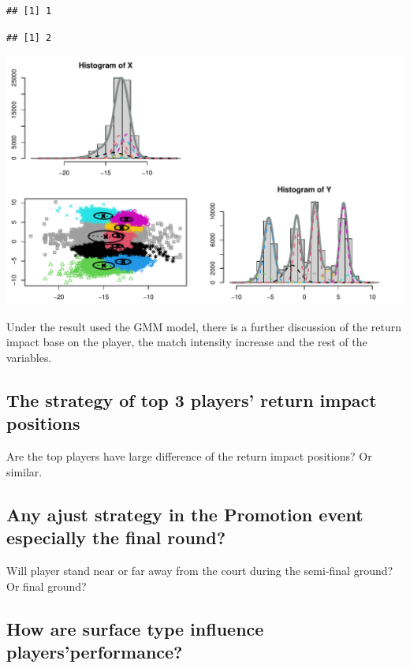 \documentclass[11pt,a4paper,]{article}
\begin{document}
\begin{verbatim}
## [1] 1
\end{verbatim}

\begin{verbatim}
## [1] 2
\end{verbatim}

\includegraphics{Report_files/figure-latex/unnamed-chunk-4-1.pdf}

Under the result used the GMM model, there is a further discussion of the return impact base on the player, the match intensity increase and the rest of the variables.

\hypertarget{the-strategy-of-top-3-players-return-impact-positions}{%
\subsection{The strategy of top 3 players' return impact positions}\label{the-strategy-of-top-3-players-return-impact-positions}}

Are the top players have large difference of the return impact positions? Or similar.

\hypertarget{any-ajust-strategy-in-the-promotion-event-especially-the-final-round}{%
\subsection{Any ajust strategy in the Promotion event especially the final round?}\label{any-ajust-strategy-in-the-promotion-event-especially-the-final-round}}

Will player stand near or far away from the court during the semi-final ground? Or final ground?

\hypertarget{how-are-surface-type-influence-playersperformance}{%
\subsection{How are surface type influence players'performance?}\label{how-are-surface-type-influence-playersperformance}}
\end{document}
